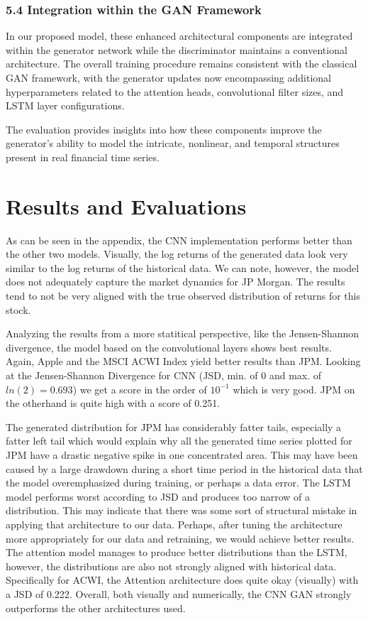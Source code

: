 \documentclass{article}
\begin{document}
\subsubsection*{5.4 Integration within the GAN Framework}

In our proposed model, these enhanced architectural components are integrated within the generator network while the discriminator maintains a conventional architecture. The overall training procedure remains consistent with the classical GAN framework, with the generator updates now encompassing additional hyperparameters related to the attention heads, convolutional filter sizes, and LSTM layer configurations.

The evaluation provides insights into how these components improve the generator's ability to model the intricate, nonlinear, and temporal structures present in real financial time series.


\section{Results and Evaluations}

As can be seen in the appendix, the CNN implementation performs better than the other two models. Visually, the log returns of the generated data look very similar to the log returns of the historical data. We can note, however, the model does not adequately capture the market dynamics for JP Morgan. The results tend to not be very aligned with the true observed distribution of returns for this stock.

Analyzing the results from a more statitical perspective, like the Jensen-Shannon divergence, the model based on the convolutional layers shows best results. Again, Apple and the MSCI ACWI Index yield better results than JPM. Looking at the Jensen-Shannon Divergence for CNN (JSD, min. of 0 and max. of $ ln(2) = 0.693 $) we get a score in the order of $ 10^{-1} $ which is very good. JPM on the otherhand is quite high with a score of 0.251.

The generated distribution for JPM has considerably fatter tails, especially a fatter left tail which would explain why all the generated time series plotted for JPM have a drastic negative spike in one concentrated area. This may have been caused by a large drawdown during a short time period in the historical data that the model overemphasized during training, or perhaps a data error. The LSTM model performs worst according to JSD and produces too narrow of a distribution. This may indicate that there was some sort of structural mistake in applying that architecture to our data. Perhaps, after tuning the architecture more appropriately for our data and retraining, we would achieve better results. The attention model manages to produce better distributions than the LSTM, however, the distributions are also not strongly aligned with historical data. Specifically for ACWI, the Attention architecture does quite okay (visually) with a JSD of 0.222. Overall, both visually and numerically, the CNN GAN strongly outperforms the other architectures used.
\end{document}
